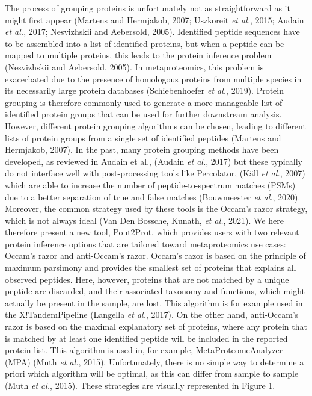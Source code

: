 The process of grouping proteins is unfortunately not as straightforward
as it might first appear (Martens and Hermjakob, 2007; Uszkoreit
\emph{et al.}, 2015; Audain \emph{et al.}, 2017; Nesvizhskii and
Aebersold, 2005). Identified peptide sequences have to be assembled into
a list of identified proteins, but when a peptide can be mapped to
multiple proteins, this leads to the protein inference problem
(Nesvizhskii and Aebersold, 2005). In metaproteomics, this problem is
exacerbated due to the presence of homologous proteins from multiple
species in its necessarily large protein databases (Schiebenhoefer
\emph{et al.}, 2019). Protein grouping is therefore commonly used to
generate a more manageable list of identified protein groups that can be
used for further downstream analysis. However, different protein
grouping algorithms can be chosen, leading to different lists of protein
groups from a single set of identified peptides (Martens and Hermjakob,
2007). In the past, many protein grouping methods have been developed,
as reviewed in Audain et al., (Audain \emph{et al.}, 2017) but these
typically do not interface well with post-processing tools like
Percolator, (Käll \emph{et al.}, 2007) which are able to increase the
number of peptide-to-spectrum matches (PSMs) due to a better separation
of true and false matches (Bouwmeester \emph{et al.}, 2020). Moreover,
the common strategy used by these tools is the Occam's razor strategy,
which is not always ideal (Van Den Bossche, Kunath, \emph{et al.},
2021). We here therefore present a new tool, Pout2Prot, which provides
users with two relevant protein inference options that are tailored
toward metaproteomics use cases: Occam's razor and anti-Occam's razor.
Occam's razor is based on the principle of maximum parsimony and
provides the smallest set of proteins that explains all observed
peptides. Here, however, proteins that are not matched by a unique
peptide are discarded, and their associated taxonomy and functions,
which might actually be present in the sample, are lost. This algorithm
is for example used in the X!TandemPipeline (Langella \emph{et al.},
2017). On the other hand, anti-Occam's razor is based on the maximal
explanatory set of proteins, where any protein that is matched by at
least one identified peptide will be included in the reported protein
list. This algorithm is used in, for example, MetaProteomeAnalyzer (MPA)
(Muth \emph{et al.}, 2015). Unfortunately, there is no simple way to
determine a priori which algorithm will be optimal, as this can differ
from sample to sample (Muth \emph{et al.}, 2015). These strategies are
visually represented in Figure 1.

